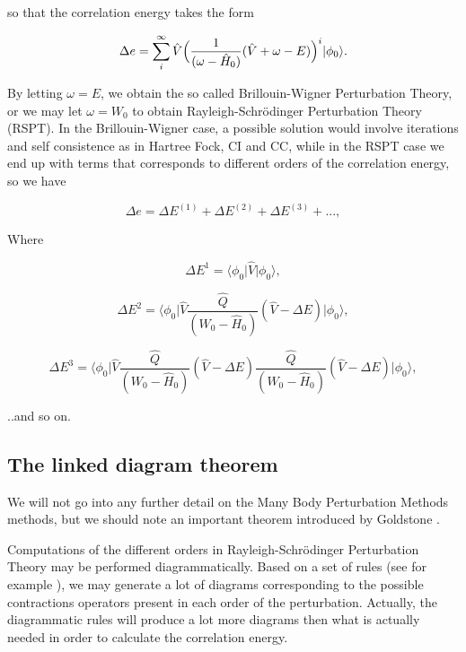 so that the correlation energy takes the form

\begin{equation}
\Delta e = \sum_i^\infty  \hat{V} \Big{(} \frac{1}{(\omega - \hat{H}_0)} (\hat{V} + \omega - E) \Big{)}^i \vert \phi_0 \rangle .
\label{eqn:pt_2}
\end{equation}

By letting $\omega = E$, we obtain the so called Brillouin-Wigner Perturbation Theory, or we may let $\omega = W_0$ to obtain Rayleigh-Schrödinger Perturbation Theory (RSPT). In the Brillouin-Wigner case, a possible solution would involve iterations and self consistence as in Hartree Fock, CI and CC, while in the RSPT case we end up with terms that corresponds to different orders of the correlation energy, so we have

\begin{equation}
\Delta e = \Delta E^{(1)}+\Delta E^{(2)}+\Delta E^{(3)}+... ,
\end{equation}

Where

\begin{equation}
\Delta E^{1} = \langle \phi_0 \vert \hat{V} \vert \phi_0 \rangle,
\end{equation}

\begin{equation}
\Delta E^{2} = \langle \phi_0 \vert \hat{V}  \frac{\hat{Q}}{(W_0 - \hat{H}_0)}  (\hat{V} - \Delta E) \vert \phi_0 \rangle,
\end{equation}

\begin{equation}
\Delta E^{3} = \langle \phi_0 \vert \hat{V} \frac{\hat{Q}}{(W_0 - \hat{H}_0)}  (\hat{V} - \Delta E) \frac{\hat{Q}}{(W_0 - \hat{H}_0)}  (\hat{V} - \Delta E)  \vert \phi_0 \rangle,
\end{equation}

..and so on.






\subsection{The linked diagram theorem}

We will not go into any further detail on the Many Body Perturbation Methods methods, but we should note an important theorem introduced by Goldstone \cite{Goldstone1957} \cite[p.152]{ShavittBartlett2009}. 

Computations of the different orders in Rayleigh-Schrödinger Perturbation Theory may be performed diagrammatically. Based on a set of rules (see for example \cite{ShavittBartlett2009}), we may generate a lot of diagrams corresponding to the possible contractions operators present in each order of the perturbation. Actually, the diagrammatic rules will produce a lot more diagrams then what is actually needed in order to calculate the correlation energy. 

